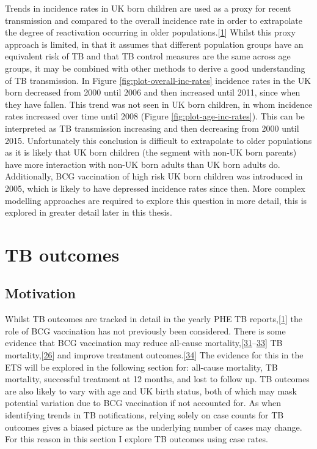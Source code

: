 \documentclass[11pt,twoside]{bristolthesis}
\begin{document}
  Trends in incidence rates in UK born children are used as a proxy for recent transmission and compared to the overall incidence rate in order to extrapolate the degree of reactivation occurring in older populations.{[}\protect\hyperlink{ref-PHE2017}{1}{]} Whilst this proxy approach is limited, in that it assumes that different population groups have an equivalent risk of TB and that TB control measures are the same across age groups, it may be combined with other methods to derive a good understanding of TB transmission. In Figure \ref{fig:plot-overall-inc-rates} incidence rates in the UK born decreased from 2000 until 2006 and then increased until 2011, since when they have fallen. This trend was not seen in UK born children, in whom incidence rates increased over time until 2008 (Figure \ref{fig:plot-age-inc-rates}). This can be interpreted as TB transmission increasing and then decreasing from 2000 until 2015. Unfortunately this conclusion is difficult to extrapolate to older populations as it is likely that UK born children (the segment with non-UK born parents) have more interaction with non-UK born adults than UK born adults do. Additionally, BCG vaccination of high risk UK born children was introduced in 2005, which is likely to have depressed incidence rates since then. More complex modelling approaches are required to explore this question in more detail, this is explored in greater detail later in this thesis.
  
  \hypertarget{tb-outcomes}{%
  \section{TB outcomes}\label{tb-outcomes}}
  
  \hypertarget{motivation-1}{%
  \subsection{Motivation}\label{motivation-1}}
  
  Whilst TB outcomes are tracked in detail in the yearly PHE TB reports,{[}\protect\hyperlink{ref-PHE2017}{1}{]} the role of BCG vaccination has not previously been considered. There is some evidence that BCG vaccination may reduce all-cause mortality,{[}\protect\hyperlink{ref-Garly2003}{31}--\protect\hyperlink{ref-Rieckmann2016}{33}{]} TB mortality,{[}\protect\hyperlink{ref-Abubakar2013}{26}{]} and improve treatment outcomes.{[}\protect\hyperlink{ref-Jeremiah2010}{34}{]} The evidence for this in the ETS will be explored in the following section for: all-cause mortality, TB mortality, successful treatment at 12 months, and lost to follow up. TB outcomes are also likely to vary with age and UK birth status, both of which may mask potential variation due to BCG vaccination if not accounted for. As when identifying trends in TB notifications, relying solely on case counts for TB outcomes gives a biased picture as the underlying number of cases may change. For this reason in this section I explore TB outcomes using case rates.
  
\end{document}
